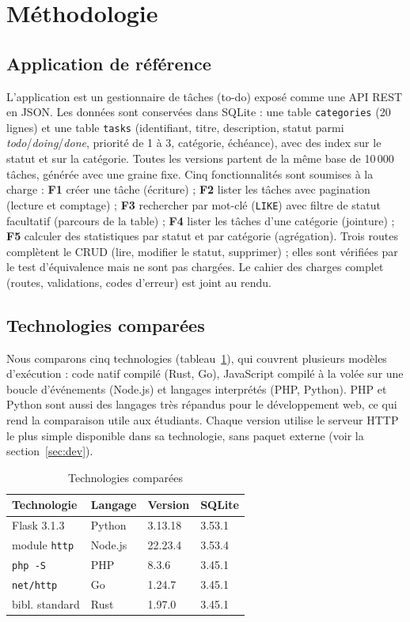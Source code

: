\section{Méthodologie}\label{sec:methodo}
\subsection{Application de référence}
L'application est un gestionnaire de tâches (to-do) exposé comme une API REST en JSON. Les données sont
conservées dans SQLite : une table \texttt{categories} (20 lignes) et une table \texttt{tasks} (identifiant, titre,
description, statut parmi \textit{todo}/\textit{doing}/\textit{done}, priorité de 1 à 3, catégorie, échéance), avec
des index sur le statut et sur la catégorie. Toutes les versions partent de la même base de 10\,000 tâches, générée
avec une graine fixe. Cinq fonctionnalités sont soumises à la charge :
\textbf{F1} créer une tâche (écriture) ;
\textbf{F2} lister les tâches avec pagination (lecture et comptage) ;
\textbf{F3} rechercher par mot-clé (\texttt{LIKE}) avec filtre de statut facultatif (parcours de la table) ;
\textbf{F4} lister les tâches d'une catégorie (jointure) ;
\textbf{F5} calculer des statistiques par statut et par catégorie (agrégation).
Trois routes complètent le CRUD (lire, modifier le statut, supprimer) ; elles sont vérifiées par le test
d'équivalence mais ne sont pas chargées. Le cahier des charges complet (routes, validations, codes d'erreur) est joint
au rendu.

\subsection{Technologies comparées}
Nous comparons cinq technologies (tableau~\ref{tab:techs}), qui couvrent plusieurs modèles d'exécution : code natif
compilé (Rust, Go), JavaScript compilé à la volée sur une boucle d'événements (Node.js) et langages interprétés
(PHP, Python). PHP et Python sont aussi des langages très répandus pour le développement web, ce qui rend
la comparaison utile aux étudiants. Chaque version utilise le serveur HTTP le plus simple disponible dans sa
technologie, sans paquet externe (voir la section~\ref{sec:dev}).

\begin{table}[t]
\caption{Technologies comparées}\label{tab:techs}
\centering\small
\begin{tabular}{@{}llll@{}}
\toprule
\textbf{Technologie} & \textbf{Langage} & \textbf{Version} & \textbf{SQLite}\\
\midrule
Flask 3.1.3 & Python & 3.13.18 & 3.53.1\\
module \texttt{http} & Node.js & 22.23.4 & 3.53.4\\
\texttt{php -S} & PHP & 8.3.6 & 3.45.1\\
\texttt{net/http} & Go & 1.24.7 & 3.45.1\\
bibl. standard & Rust & 1.97.0 & 3.45.1\\
\bottomrule
\end{tabular}
\end{table}

